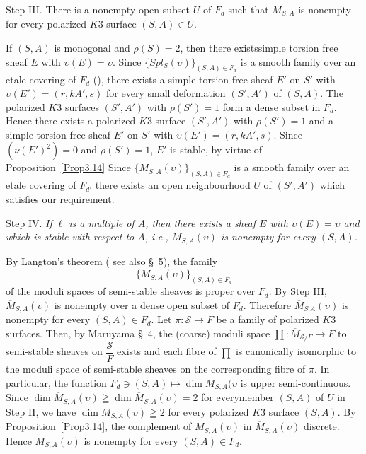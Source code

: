 Step III. There is a nonempty open subset $U$ of $F_d$ such that
$M_{S,A}$ is nonempty for every polarized $K3$ surface $(S,A)\in U$.

\begin{Proof}
If $(S,A)$ is monogonal and $\rho(S)=2$, then there exists\pageoriginale simple
torsion free sheaf $E$ with $\upsilon(E)=\upsilon$. Since
$\{Spl_S(\upsilon)\}_{(S,A)\in F_d}$ is a smooth family over an etale
covering of $F_d$ (\cite[Theorem1.17]{key12}), there
exists a simple torsion free sheaf $E'$ on $S'$ with
$\upsilon(E')=(r,kA',s)$ for every small deformation $(S',A')$ of
$(S,A)$. The polarized $K3$ surfaces $(S',A')$ with $\rho(S')=1$ form
a dense subset in $F_d$. Hence there exists a polarized $K3$ surface
$(S',A')$ with $\rho(S')=1$ and a simple torsion free sheaf $E'$ on $S'$
with $\upsilon(E')=(r,kA',s)$. Since $(\nu(E')^{2})=0$ and
$\rho(S')=1$, $E'$ is stable, by virtue of Proposition~\ref{Prop3.14}
Since $\{M_{S,A}(\upsilon)\}_{(S,A)\in F_d}$ is a smooth family over
an etale covering of $F_{d'}$ there exists an open neighbourhood $U$
of $(S',A')$ which satisfies our requirement.
\enprf
\end{Proof}

Step IV. \textit{If $\ell$ is a multiple of $A$, then there exists a
sheaf $E$ with $\upsilon(E)=\upsilon$ and which is stable with respect
to $A$, i.e., $M_{S,A}(\upsilon)$ is nonempty for every $(S,A)$.}

\begin{Proof}
By Langton's theorem (\cite{key6} see also \cite{key9} \S\ 5), the
family 
$$
\{\overline{M}_{S,A}(\upsilon)\}_{(S,A)\in F_d}
$$ 
of the
moduli spaces of semi-stable sheaves is proper over $F_d$. By Step
III, $\overline{M}_{S,A}(\upsilon)$ is nonempty over a dense open
subset of $F_d$. Therefore $\overline{M}_{S.A}(\upsilon)$ is nonempty
for every $(S,A)\in F_d$. Let $\pi:\mathscr{S}\to F$ be a family of
polarized $K3$ surfaces. Then, by Maruyama \cite{key9}\S\ 4, the
(coarse) moduli space $\prod:\overline{M}_{\mathscr{S}/F}\to F$ to
semi-stable sheaves on $\dfrac{\mathscr{S}}{F}$ exists and each fibre of
$\prod$ is canonically isomorphic to the moduli space of semi-stable
sheaves on the corresponding fibre of $\pi$. In particular, the
function $F_d\ni (S,A)\mapsto \dim \overline{M}_{S,A}(\upsilon$ is
upper semi-continuous. Since
$\dim \overline{M}_{S,A}(\upsilon)\geqq \dim \overline{M}_{S,A}(\upsilon)=2$
for every\pageoriginale member $(S,A)$ of $U$ in Step II, we have
$\dim \overline{M}_{S,A}(\upsilon)\geqq 2$ for every polarized $K3$
surface $(S,A)$. By Proposition~\ref{Prop3.14}, the complement of
$M_{S,A}(\upsilon)$ in $\overline{M}_{S,A}(\upsilon)$ discrete. Hence
$M_{S,A}(\upsilon)$ is nonempty for every $(S,A)\in F_d$.
\enprf
\end{Proof}

